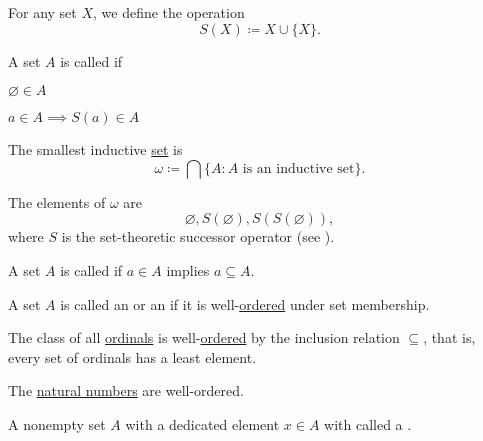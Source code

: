 \begin{definition}\label{def:successor_operator}\cite[68]{Enderton1977}
  For any set \( X \), we define the  operation
  \begin{equation*}
    S(X) \coloneqq X \cup \{ X \}.
  \end{equation*}
\end{definition}

\begin{definition}\label{def:inductive_set}\cite[68]{Enderton1977}
  A set \( A \) is called  if
  \begin{defenum}
    \item \( \varnothing \in A \)
    \item \( a \in A \implies S(a) \in A \)
  \end{defenum}
\end{definition}

\begin{definition}\label{def:smallest_inductive_set}
  The smallest inductive \hyperref[def:inductive_set]{set} is
  \begin{equation*}
    \omega \coloneqq \bigcap \{ A \colon A \text{ is an inductive set} \}.
  \end{equation*}

  The elements of \( \omega \) are
  \begin{equation*}
    \varnothing, S(\varnothing), S(S(\varnothing)),
  \end{equation*}
  where \( S \) is the set-theoretic successor operator (see ).
\end{definition}

\begin{definition}\label{def:transitive_set}\cite[71]{Enderton1977}
  A set \( A \) is called  if \( a \in A \) implies \( a \subseteq A \).
\end{definition}

\begin{definition}\label{def:ordinal}\cite[theorem 7L]{Enderton1977}
  A set \( A \) is called an  or an  if it is well-\hyperref[def:well_ordered_set]{ordered} under set membership.
\end{definition}

\begin{theorem}\label{thm:ordinals_are_well_ordered}\cite[theorem 7M]{Enderton1977}
  The class of all \hyperref[def:ordinal]{ordinals} is well-\hyperref[def:well_ordered_set]{ordered} by the inclusion relation \( \subseteq \), that is, every set of ordinals has a least element.
\end{theorem}

\begin{corollary}\label{thm:natural_numbers_are_well_ordered}
  The \hyperref[def:natural_numbers]{natural numbers} are well-ordered.
\end{corollary}

\begin{definition}\label{def:pointed_set}
  A nonempty set \( A \) with a dedicated element \( x \in A \) with called a .
\end{definition}
